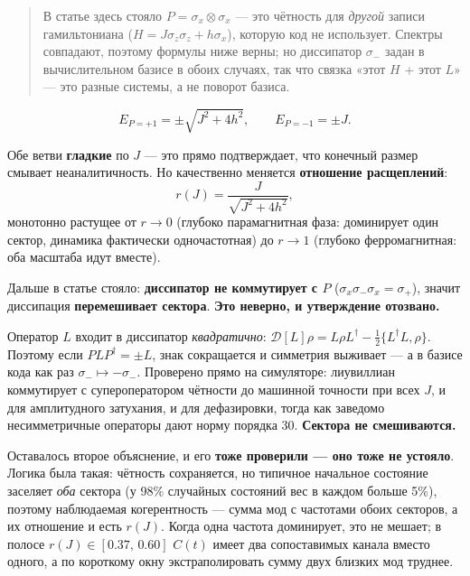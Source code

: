 \documentclass[12pt,a4paper]{article}
\begin{document}
\begin{quote}
\small В статье здесь стояло $P=\sigma_x\otimes\sigma_x$ — это чётность для
\emph{другой} записи гамильтониана ($H=J\sigma_z\sigma_z+h\sigma_x$), которую
код не использует. Спектры совпадают, поэтому формулы ниже верны; но
диссипатор $\sigma_-$ задан в вычислительном базисе в обоих случаях, так что
связка «этот $H$ + этот $L$» — это разные системы, а не поворот базиса.
\end{quote}

\begin{equation}
  E_{P=+1}=\pm\sqrt{J^2+4h^2},\qquad E_{P=-1}=\pm J.
\end{equation}

Обе ветви \textbf{гладкие} по $J$ — это прямо подтверждает, что конечный размер
смывает неаналитичность. Но качественно меняется \textbf{отношение расщеплений}:
\begin{equation}
  r(J)=\frac{J}{\sqrt{J^2+4h^2}},
\end{equation}
монотонно растущее от $r\to 0$ (глубоко парамагнитная фаза: доминирует один
сектор, динамика фактически одночастотная) до $r\to 1$ (глубоко ферромагнитная:
оба масштаба идут вместе).

Дальше в статье стояло: \textbf{диссипатор не коммутирует с $P$}
($\sigma_x\sigma_-\sigma_x=\sigma_+$), значит диссипация \textbf{перемешивает
сектора}. \textbf{Это неверно, и утверждение отозвано.}

Оператор $L$ входит в диссипатор \emph{квадратично}:
$\mathcal{D}[L]\rho = L\rho L^\dagger-\tfrac12\{L^\dagger L,\rho\}$. Поэтому если
$PLP^\dagger=\pm L$, знак сокращается и симметрия выживает — а в базисе кода
как раз $\sigma_-\mapsto-\sigma_-$. Проверено прямо на симуляторе: лиувиллиан
коммутирует с супероператором чётности до машинной точности при всех $J$, и для
амплитудного затухания, и для дефазировки, тогда как заведомо несимметричные
операторы дают норму порядка 30. \textbf{Сектора не смешиваются.}

Оставалось второе объяснение, и его \textbf{тоже проверили — оно тоже не
устояло}. Логика была такая: чётность сохраняется, но типичное начальное
состояние заселяет \emph{оба} сектора (у 98\% случайных состояний вес в каждом
больше 5\%), поэтому наблюдаемая когерентность — сумма мод с частотами обоих
секторов, а их отношение и есть $r(J)$. Когда одна частота доминирует, это не
мешает; в полосе $r(J)\in[0.37,\,0.60]$ $C(t)$ имеет два сопоставимых канала
вместо одного, а по короткому окну экстраполировать сумму двух близких мод
труднее.
\end{document}
